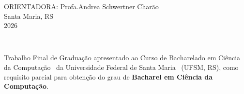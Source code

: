 \documentclass[
	article,			%
	12pt,				%
	oneside,			%
	a4paper,			%
	chapter=TITLE,		%
	section=TITLE,		%
	english,			%
	brazil,				%
    sumario=tradicional
	]{abntex2}
\newcommand{\MyInstitution}{Universidade Federal de Santa Maria}
\newcommand{\MyCourse}{Curso de Bacharelado em Ciência da Computação}
\newcommand{\MyDegree}{Bacharel em Ciência da Computação}
\newcommand{\MyLocation}{Santa Maria, RS}
\newcommand{\MyDescriptionText}{Trabalho Final de Graduação apresentado ao \MyCourse~ da \MyInstitution~ (UFSM, RS), como requisito parcial para obtenção do grau de \textbf{\MyDegree}.}
\newcommand{\MyAdvisorName}{Andrea Schwertner Charão}
\newcommand{\MyAdvisorTitle}{ORIENTADORA: Profa.}
\newcommand{\MyYear}{2026}
\begin{document}
    \begin{center}
        {{{\MyAdvisorTitle \MyAdvisorName}}}\\  
    \vspace{\fill}
        {\MyLocation\\
        \MyYear}
    \end{center}

\newpage


% 




\setlength{\parskip}{0.0cm}

      \begin{center}
         \SingleSpacing
         \textbf{\noindent\theauthor}\\
         \vspace{6.0\baselineskip}
         \MakeUppercase{\textbf{\noindent\thetitle}}
         \vspace{4.0\baselineskip}
      \end{center}   
    
      \noindent\begin{flushright}
      \noindent\begin{minipage}{0.5\textwidth}
      \SingleSpacing
      {\noindent \MyDescriptionText}
      \end{minipage}
      \end{flushright}
    
\end{document}
